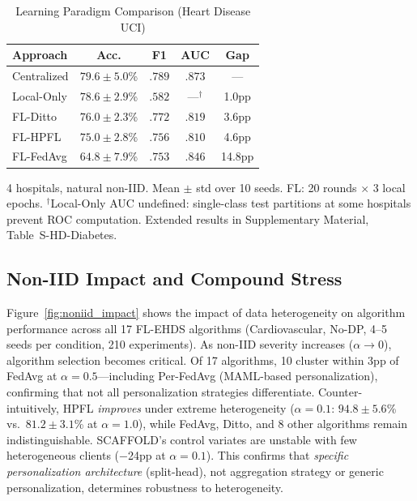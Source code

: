 \documentclass[conference]{IEEEtran}
\begin{document}
\begin{table}[htbp]
\centering
\caption{Learning Paradigm Comparison (Heart Disease UCI)}
\label{tab:fl_vs_central}
\small
\begin{tabular}{lcccc}
\toprule
\textbf{Approach} & \textbf{Acc.} & \textbf{F1} & \textbf{AUC} & \textbf{Gap} \\
\midrule
Centralized & $79.6 \pm 5.0$\% & $.789$ & $.873$ & --- \\
Local-Only & $78.6 \pm 2.9$\% & $.582$ & ---$^\dagger$ & 1.0pp \\
FL-Ditto & $76.0 \pm 2.3$\% & $.772$ & $.819$ & 3.6pp \\
FL-HPFL & $75.0 \pm 2.8$\% & $.756$ & $.810$ & 4.6pp \\
FL-FedAvg & $64.8 \pm 7.9$\% & $.753$ & $.846$ & 14.8pp \\
\bottomrule
\end{tabular}

\vspace{1mm}
\footnotesize{4 hospitals, natural non-IID. Mean $\pm$ std over 10 seeds. FL: 20 rounds $\times$ 3 local epochs. $^\dagger$Local-Only AUC undefined: single-class test partitions at some hospitals prevent ROC computation. Extended results in Supplementary Material, Table~S-HD-Diabetes.}
\end{table}

\subsection{Non-IID Impact and Compound Stress}

Figure~\ref{fig:noniid_impact} shows the impact of data heterogeneity on algorithm performance across all 17 FL-EHDS algorithms (Cardiovascular, No-DP, 4--5 seeds per condition, 210 experiments). As non-IID severity increases ($\alpha \to 0$), algorithm selection becomes critical. Of 17 algorithms, 10 cluster within 3pp of FedAvg at $\alpha{=}0.5$---including Per-FedAvg (MAML-based personalization), confirming that not all personalization strategies differentiate. Counter-intuitively, HPFL \textit{improves} under extreme heterogeneity ($\alpha{=}0.1$: $94.8 \pm 5.6$\% vs.\ $81.2 \pm 3.1$\% at $\alpha{=}1.0$), while FedAvg, Ditto, and 8 other algorithms remain indistinguishable. SCAFFOLD's control variates are unstable with few heterogeneous clients ($-$24pp at $\alpha{=}0.1$). This confirms that \textit{specific personalization architecture} (split-head), not aggregation strategy or generic personalization, determines robustness to heterogeneity.
\end{document}
